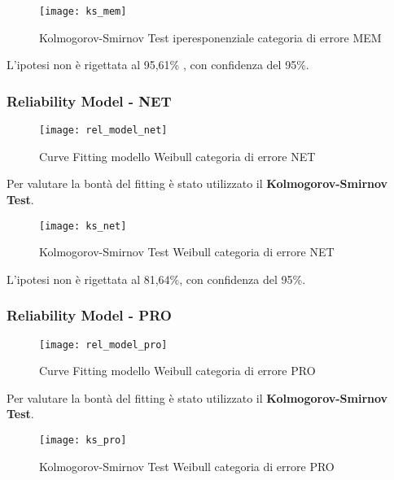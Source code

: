 \begin{figure}[!htbp]
  \centering
  \texttt{[image: ks\_mem]}
  \caption{Kolmogorov-Smirnov Test iperesponenziale categoria di errore MEM}
  \label{ks_mem}
\end{figure}

L'ipotesi non è rigettata al 95,61\% , con confidenza del 95\%.\\

\clearpage
\subsubsection*{Reliability Model - NET}

\begin{figure}[!htbp]
  \centering
  \texttt{[image: rel\_model\_net]}
  \caption{Curve Fitting modello Weibull categoria di errore NET}
  \label{rel_model_net}
\end{figure}

Per valutare la bontà del fitting è stato utilizzato il \textbf{Kolmogorov-Smirnov Test}.\\

\begin{figure}[!htbp]
  \centering
  \texttt{[image: ks\_net]}
  \caption{Kolmogorov-Smirnov Test Weibull categoria di errore NET}
  \label{ks_net}
\end{figure}

L'ipotesi non è rigettata al 81,64\%, con confidenza del 95\%.\\

\clearpage
\subsubsection*{Reliability Model - PRO}

\begin{figure}[!htbp]
  \centering
  \texttt{[image: rel\_model\_pro]}
  \caption{Curve Fitting modello Weibull categoria di errore PRO}
  \label{rel_model_pro}
\end{figure}

Per valutare la bontà del fitting è stato utilizzato il \textbf{Kolmogorov-Smirnov Test}.\\

\begin{figure}[!htbp]
  \centering
  \texttt{[image: ks\_pro]}
  \caption{Kolmogorov-Smirnov Test Weibull categoria di errore PRO}
  \label{ks_pro}
\end{figure}

